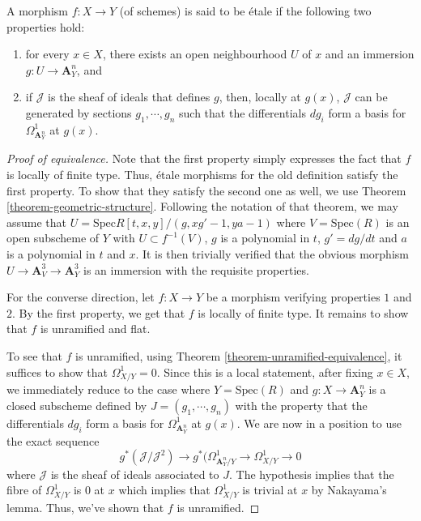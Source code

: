 \begin{definition}
\label{definition-etale-differential}
A morphism $f:X \to Y$ (of schemes) is said to be \'etale if the following
two properties hold:
\begin{enumerate}
\item for every $x \in X$, there exists an open neighbourhood $U$ of $x$ and an 
immersion $g:U \to \mathbf{A}^n_Y$, and
\item if $\mathcal{J}$ is the sheaf of ideals that defines $g$, then, locally at
$g(x)$, $\mathcal{J}$ can be generated by sections $g_1,\cdots,g_n$ such that 
the
differentials $dg_i$ form a basis for $\Omega^1_{\mathbf{A}^n_Y}$ at $g(x)$.  
\end{enumerate}
\end{definition}

\begin{proof}[Proof of equivalence]
Note that the first property simply expresses the fact that $f$ is locally of
finite type. Thus, \'etale morphisms for the old definition satisfy the first
property. To show that they satisfy the second one as well, we use Theorem
\ref{theorem-geometric-structure}. Following the notation of that theorem,
we may assume that $U = \text{Spec}  R[t,x,y]/(g,xg' - 1, ya - 1)$ where
$V = \text{Spec}(R)$ is an open subscheme of $Y$ with $U \subset f^{-1}(V)$, $g$
is a polynomial in $t$, $g' = dg/dt$ and $a$ is a polynomial in $t$ and $x$.
It is then trivially verified that the obvious morphism
$U \to \mathbf{A}^3_V \to \mathbf{A}^3_Y$ is an immersion with the requisite 
properties.

\medskip\noindent
For the converse direction, let $f:X \to Y$ be a morphism verifying properties
$1$ and $2$. By the first property, we get that $f$ is locally of finite type.
It remains to show that $f$ is unramified and flat.

\medskip\noindent
To see that $f$ is unramified, using Theorem
\ref{theorem-unramified-equivalence}, it suffices to show that
$\Omega^1_{X/Y} = 0$. Since this is a local statement, after fixing $x \in X$,
we immediately reduce to the case where $Y = \text{Spec}(R)$ and $g:X \to 
\mathbf{A}^n_Y$ is
a closed subscheme defined by $J = (g_1,\cdots,g_n)$ with the property that
the differentials $dg_i$ form a basis for $\Omega^1_{\mathbf{A}^n_Y}$ at 
$g(x)$. We
are now in a position to use the exact sequence 
$$
g^*(\mathcal{J}/\mathcal{J}^2) \to g^*(\Omega^1_{\mathbf{A}^n_Y/Y} \to 
\Omega^1_{X/Y} \to 0
$$
where $\mathcal{J}$ is the sheaf of ideals associated to $J$. The hypothesis 
implies
that the fibre of $\Omega^1_{X/Y}$ is $0$ at $x$ which implies that
$\Omega^1_{X/Y}$ is trivial at $x$ by Nakayama's lemma. Thus, we've shown
that $f$ is unramified.


\end{proof}
